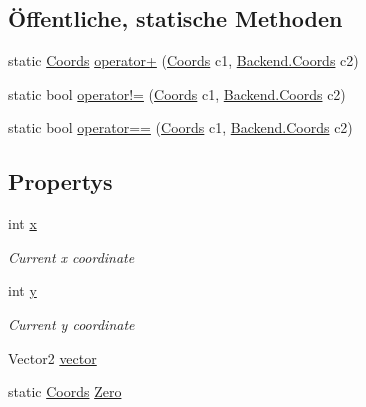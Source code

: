 \subsection*{Öffentliche, statische Methoden}
\begin{DoxyCompactItemize}
\item 
static \hyperlink{class_gruppe22_1_1_backend_1_1_coords}{Coords} \hyperlink{class_gruppe22_1_1_backend_1_1_coords_a300f68b47e61012007f61383a1a23cd3}{operator+} (\hyperlink{class_gruppe22_1_1_backend_1_1_coords}{Coords} c1, \hyperlink{class_gruppe22_1_1_backend_1_1_coords}{Backend.\-Coords} c2)
\item 
static bool \hyperlink{class_gruppe22_1_1_backend_1_1_coords_afda506d3a645625175835c78e64cc325}{operator!=} (\hyperlink{class_gruppe22_1_1_backend_1_1_coords}{Coords} c1, \hyperlink{class_gruppe22_1_1_backend_1_1_coords}{Backend.\-Coords} c2)
\item 
static bool \hyperlink{class_gruppe22_1_1_backend_1_1_coords_a79eefabf66131259ce0d0fecd10a7cc3}{operator==} (\hyperlink{class_gruppe22_1_1_backend_1_1_coords}{Coords} c1, \hyperlink{class_gruppe22_1_1_backend_1_1_coords}{Backend.\-Coords} c2)
\end{DoxyCompactItemize}
\subsection*{Propertys}
\begin{DoxyCompactItemize}
\item 
int \hyperlink{class_gruppe22_1_1_backend_1_1_coords_a5d6a2857d47b7fb03ff0fa9c07a41d11}{x}
\begin{DoxyCompactList}\small\item\em Current x coordinate \end{DoxyCompactList}\item 
int \hyperlink{class_gruppe22_1_1_backend_1_1_coords_a941b0ec77fa0973cc2faf35f9a6d85dd}{y}
\begin{DoxyCompactList}\small\item\em Current y coordinate \end{DoxyCompactList}\item 
Vector2 \hyperlink{class_gruppe22_1_1_backend_1_1_coords_a44af20a66f196320d537beed94622ce4}{vector}
\item 
static \hyperlink{class_gruppe22_1_1_backend_1_1_coords}{Coords} \hyperlink{class_gruppe22_1_1_backend_1_1_coords_ac2aea2e761ea4b4c95ef1667eb8dfaf8}{Zero}
\end{DoxyCompactItemize}


